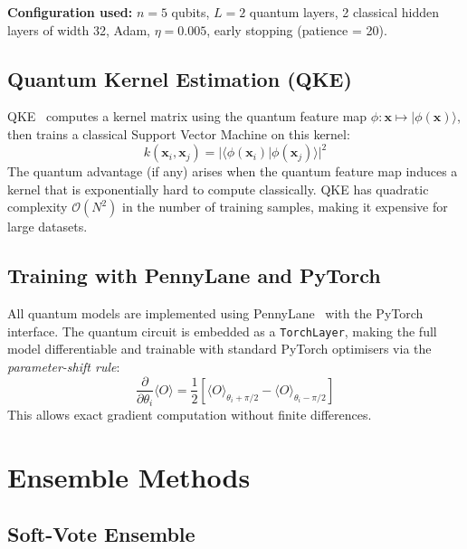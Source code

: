\documentclass[12pt, a4paper]{article}
\newcommand{\vect}[1]{\boldsymbol{#1}}
\newcommand{\ket}[1]{|#1\rangle}
\newcommand{\braket}[2]{\langle #1 | #2 \rangle}
\begin{document}
\textbf{Configuration used:}
$n = 5$ qubits, $L = 2$ quantum layers, 2 classical hidden layers of width 32,
Adam, $\eta = 0.005$, early stopping (patience = 20).

\subsection{Quantum Kernel Estimation (QKE)}
\label{sec:qke}

QKE~\cite{havlicek2019supervised} computes a kernel matrix using the quantum
feature map $\phi : \vect{x} \mapsto \ket{\phi(\vect{x})}$, then trains a
classical Support Vector Machine on this kernel:
\begin{equation}
    k(\vect{x}_i, \vect{x}_j) = |\braket{\phi(\vect{x}_i)}{\phi(\vect{x}_j)}|^2
\end{equation}
The quantum advantage (if any) arises when the quantum feature map induces a
kernel that is exponentially hard to compute classically. QKE has quadratic
complexity $\mathcal{O}(N^2)$ in the number of training samples, making it
expensive for large datasets.

\subsection{Training with PennyLane and PyTorch}

All quantum models are implemented using PennyLane~\cite{pennylane2019} with
the PyTorch interface. The quantum circuit is embedded as a \texttt{TorchLayer},
making the full model differentiable and trainable with standard PyTorch
optimisers via the \emph{parameter-shift rule}:
\begin{equation}
    \frac{\partial}{\partial \theta_i} \langle O \rangle = \frac{1}{2}\left[
        \langle O \rangle_{\theta_i + \pi/2} - \langle O \rangle_{\theta_i - \pi/2}
    \right]
\end{equation}
This allows exact gradient computation without finite differences.

\section{Ensemble Methods}
\label{sec:ensemble}

\subsection{Soft-Vote Ensemble}
\end{document}

